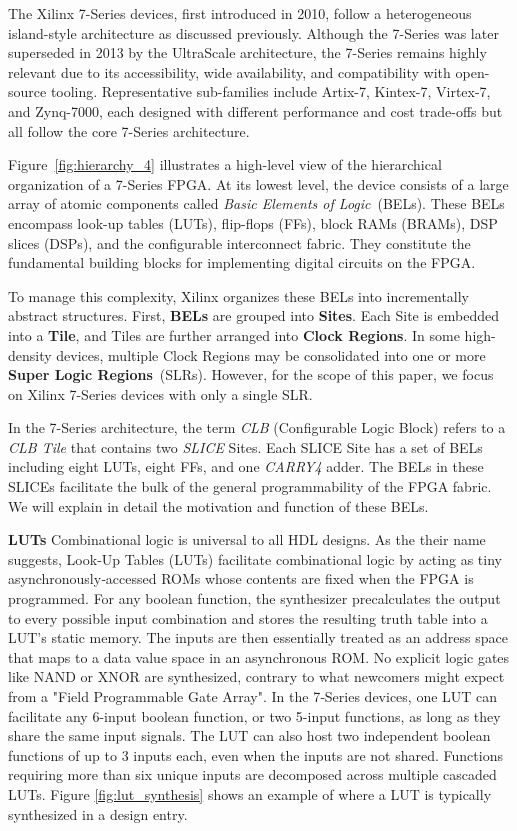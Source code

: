 \documentclass[twocolumn]{article}
\begin{document}
    The Xilinx 7-Series devices, first introduced in 2010, follow a heterogeneous island-style architecture as discussed previously. 
    Although the 7-Series was later superseded in 2013 by the UltraScale architecture, the 7-Series remains highly relevant due to its accessibility, wide availability, and compatibility with open-source tooling. 
    Representative sub-families include Artix-7, Kintex-7, Virtex-7, and Zynq-7000, each designed with different performance and cost trade-offs but all follow the core 7-Series architecture.

    Figure~\ref{fig:hierarchy_4} illustrates a high-level view of the hierarchical organization of a 7-Series FPGA. 
    At its lowest level, the device consists of a large array of atomic components called \emph{Basic Elements of Logic}~(BELs). 
    These BELs encompass look-up tables (LUTs), flip-flops (FFs), block RAMs (BRAMs), DSP slices (DSPs), and the configurable interconnect fabric. 
    They constitute the fundamental building blocks for implementing digital circuits on the FPGA.

    To manage this complexity, Xilinx organizes these BELs into incrementally abstract structures. 
    First, \textbf{BELs} are grouped into \textbf{Sites}. 
    Each Site is embedded into a \textbf{Tile}, and Tiles are further arranged into \textbf{Clock Regions}. 
    In some high-density devices, multiple Clock Regions may be consolidated into one or more \textbf{Super Logic Regions}~(SLRs). 
    However, for the scope of this paper, we focus on Xilinx 7-Series devices with only a single SLR.

    In the 7-Series architecture, the term \emph{CLB} (Configurable Logic Block) refers to a \emph{CLB Tile} that contains two \emph{SLICE} Sites. 
    Each SLICE Site has a set of BELs including eight LUTs, eight FFs, and one \emph{CARRY4} adder. 
    The BELs in these SLICEs facilitate the bulk of the general programmability of the FPGA fabric. 
    We will explain in detail the motivation and function of these BELs. 

    \textbf{LUTs} \quad
        Combinational logic is universal to all HDL designs. 
        As the their name suggests, Look‑Up Tables (LUTs) facilitate combinational logic by acting as tiny asynchronously‑accessed ROMs whose contents are fixed when the FPGA is programmed.  
        For any boolean function, the synthesizer precalculates the output to every possible input combination and stores the resulting truth table into a LUT's static memory. 
        The inputs are then essentially treated as an address space that maps to a data value space in an asynchronous ROM. 
        No explicit logic gates like NAND or XNOR are synthesized, contrary to what newcomers might expect from a "Field Programmable Gate Array". 
        In the 7‑Series devices, one LUT can facilitate any 6-input boolean function, or two 5-input functions, as long as they share the same input signals.  
        The LUT can also host two independent boolean functions of up to 3 inputs each, even when the inputs are not shared.  
        Functions requiring more than six unique inputs are decomposed across multiple cascaded LUTs.
        Figure \ref{fig:lut_synthesis} shows an example of where a LUT is typically synthesized in a design entry. 
\end{document}
